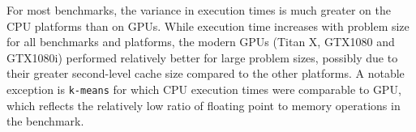 \documentclass[../document.tex]{subfiles}
\begin{document}
For most benchmarks, the variance in execution times is much greater on the CPU platforms than on GPUs.
While execution time increases with problem size for all benchmarks and platforms, the modern GPUs (Titan X, GTX1080 and GTX1080i) performed relatively better for large problem sizes, possibly due to their greater second-level cache size compared to the other platforms.
A notable exception is {\tt k-means} for which CPU execution times were comparable to GPU, which reflects the relatively low ratio of floating point to memory operations in the benchmark.

\end{document}
